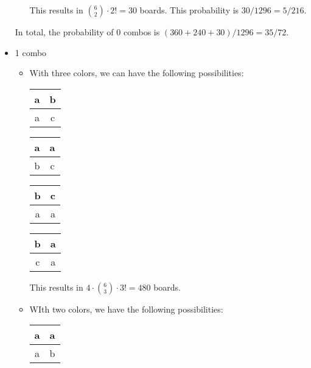 \documentclass[12pt]{article}
\theoremstyle{definition}
\begin{document}
\begin{itemize}
\begin{itemize}
\begin{center}
\begin{tabular}{|c|c|}
            \end{tabular}
        \end{center}
        This results in $\binom{6}{2}\cdot 2!=30$ boards.
        This probability is $30/1296=5/216$.
    \end{itemize}
    In total, the probability of 0 combos is $(360+240+30)/1296=35/72$.
    \item 1 combo
    \begin{itemize}
        \item With three colors, we can have the following possibilities:
        \begin{center}
            \begin{tabular}{|c|c|}
            \hline
            a & b \\
            \hline
            a & c \\
            \hline
            \end{tabular}
            \quad
            \begin{tabular}{|c|c|}
            \hline
            a & a \\
            \hline
            b & c \\
            \hline
            \end{tabular}
            \quad
            \begin{tabular}{|c|c|}
            \hline
            b & c \\
            \hline
            a & a \\
            \hline
            \end{tabular}
            \quad
            \begin{tabular}{|c|c|}
            \hline
            b & a \\
            \hline
            c & a \\
            \hline
            \end{tabular}
        \end{center}
        This results in $4\cdot \binom{6}{3}\cdot 3!=480$ boards.
        \item WIth two colors, we have the following possibilities:
        \begin{center}
            \begin{tabular}{|c|c|}
            \hline
            a & a \\
            \hline
            a & b \\
            \hline
            \end{tabular}

\end{center}
\end{itemize}
\end{itemize}
\end{document}
